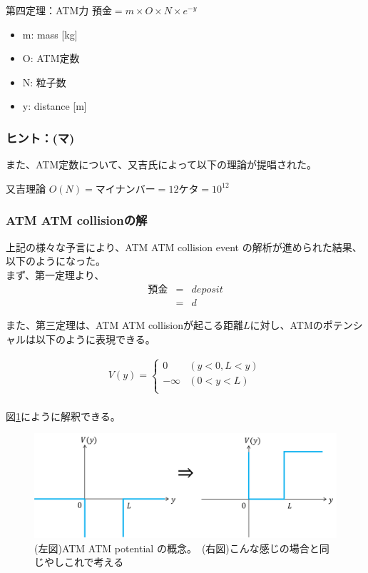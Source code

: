 \documentclass[12pt]{jsarticle}
\begin{document}
\begin{itembox}[c]{第四定理：ATM力}
$預金=m\times O \times N \times e ^{ -y }$
\begin{itemize}
\item m: mass [kg]
\item O: ATM定数
\item N: 粒子数
\item y: distance [m]
\end{itemize}
\end{itembox}

\newpage
\subsubsection{ヒント：(マ)}
\label{mata}
また、ATM定数について、又吉氏によって以下の理論が提唱された。
\begin{itembox}[c]{又吉理論}
$O(N) = マイナンバー = 12ケタ = 10^{12}$
\end{itembox}

\subsubsection{ATM ATM collisionの解}
上記の様々な予言により、ATM ATM collision event の解析が進められた結果、以下のようになった。\\
まず、第一定理より、
\begin{eqnarray}
預金 &=& deposit\nonumber\\
&=& d
\end{eqnarray}

また、第三定理は、ATM ATM collisionが起こる距離$L$に対し、ATMのポテンシャルは以下のように表現できる。

\begin{eqnarray}
V(y)=\left\{ \begin{array}{ll}
0 & (y<0,  L<y) \\
-\infty & (0<y<L) \\
\end{array} \right.
\label{ATMpotential}
\end{eqnarray}
\\
図\ref{SqureWell}にように解釈できる。

\begin{figure}[H]
\centering
\includegraphics[clip,scale=0.4]{./picture/SqureWell.png}
\caption{(左図)ATM ATM potential の概念。\
(右図)こんな感じの場合と同じやしこれで考える}
\label{SqureWell}
\end{figure}
\end{document}
